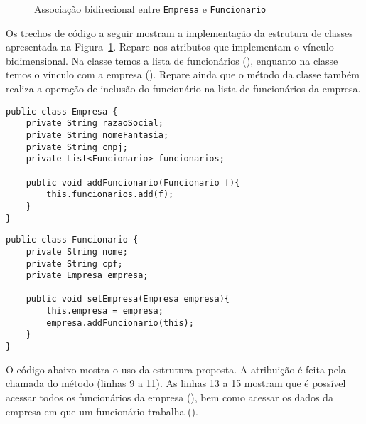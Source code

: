 \begin{figure}[h]
	\centering
	
	
	\caption{Associação bidirecional entre \texttt{Empresa} e \texttt{Funcionario}}
	\label{fig:associacao-bidirecional-empresa}
\end{figure}
 

Os trechos de código a seguir mostram a implementação da estrutura de classes apresentada na Figura~\ref{fig:associacao-bidirecional-empresa}. Repare nos atributos que implementam o vínculo bidimensional. Na classe  temos a lista de funcionários (), enquanto na classe  temos o vínculo com a empresa (). Repare ainda que o método  da classe  também realiza a operação de inclusão do funcionário na lista de funcionários da empresa.

\begin{verbatim}
public class Empresa {
	private String razaoSocial;
	private String nomeFantasia;
	private String cnpj;
	private List<Funcionario> funcionarios;
	
	public void addFuncionario(Funcionario f){
		this.funcionarios.add(f);
	}
}
\end{verbatim}

\begin{verbatim}
public class Funcionario {
	private String nome;
	private String cpf;
	private Empresa empresa;
	
	public void setEmpresa(Empresa empresa){
		this.empresa = empresa;
		empresa.addFuncionario(this);
	}
}
\end{verbatim} 

O código abaixo mostra o uso da estrutura proposta. A atribuição é feita pela chamada do método  (linhas 9 a 11). As linhas 13 a 15 mostram que é possível acessar todos os funcionários da empresa (), bem como acessar os dados da empresa em que um funcionário trabalha ().


